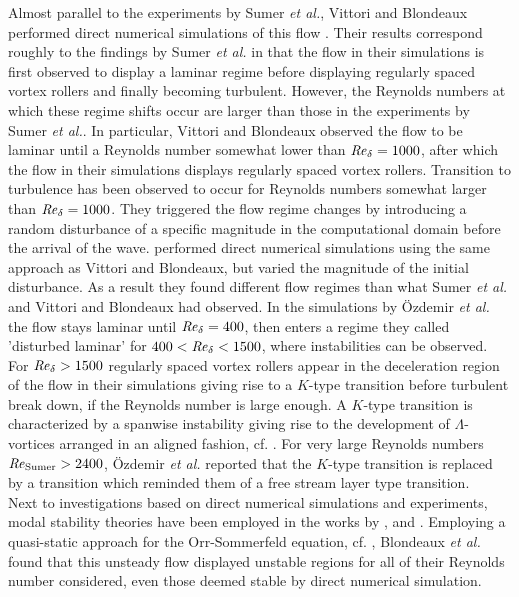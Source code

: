 \documentclass{jfm}
\newcommand\Rey{\mbox{\textit{Re}}}  %
\newcommand\sumer{{\rm Sumer}}
\begin{document}
Almost parallel to the experiments by Sumer {\em et al.}, 
Vittori and Blondeaux performed direct numerical simulations
of this flow \citep{VittoriBlondeaux2008,VittoriBlondeaux2011}. 
Their results correspond roughly to the findings by
Sumer {\em et al.} in that the flow in their simulations
is first observed to display a laminar regime before displaying
regularly spaced vortex rollers and finally becoming turbulent.
However, the Reynolds numbers at which these regime shifts 
occur
are larger than those in the experiments by Sumer {\em et al.}. 
In particular, Vittori and Blondeaux observed the flow to be laminar until
a Reynolds number somewhat lower than $ \Rey_\delta = 1000 $,
after which the flow in their simulations displays regularly spaced
vortex rollers.
Transition to turbulence has been observed to 
occur for Reynolds numbers somewhat
larger than $ \Rey_\delta = 1000 $. 
They triggered the flow regime changes
by introducing a random disturbance of a specific
magnitude in the computational domain before the arrival of the
wave. \citet{OzdemirHsuBalachandar2013}
performed direct numerical
simulations using the same approach as Vittori and Blondeaux, but
varied the magnitude of the initial disturbance. As a result
they found different flow regimes than what Sumer {\em et al.}
and Vittori and Blondeaux had observed. In the simulations
by {\"O}zdemir {\em et al.} the flow stays laminar until
$ \Rey_\delta = 400 $, then enters a regime
they called 'disturbed laminar' for $  400 < \Rey_\delta < 1500 $, where
instabilities can be observed. For $ \Rey_\delta  > 1500 $ regularly 
spaced vortex rollers appear in the deceleration region
of the flow in their simulations giving rise to a $ K $-type transition before
turbulent break down, if the Reynolds number is large enough. A $ K $-type
transition is characterized by a spanwise instability
giving rise to the development of $ \Lambda $-vortices
arranged in an aligned fashion, cf. \citet{Herbert1988}. 
For very large Reynolds numbers $ \Rey_\sumer > 2400 $,
{\"O}zdemir {\em et al.} reported that the
$ K $-type transition is replaced by a transition which reminded
them of a free stream layer type transition. \\

Next to investigations based on direct numerical simulations
and experiments,
modal stability theories have been employed in the works by 
\citet{BlondeauxPralitsVittori2012}, \citet{VerschaevePedersen2014}
and
\citet{SadekParrasDiamessisLiu2015}. 
Employing
a quasi-static approach for the Orr-Sommerfeld equation, cf. \citep{KerczekDavis1974},
Blondeaux {\em et al.} found that this unsteady flow displayed
unstable regions for all of their Reynolds number considered, even those deemed
stable by direct numerical simulation. 
\end{document}
